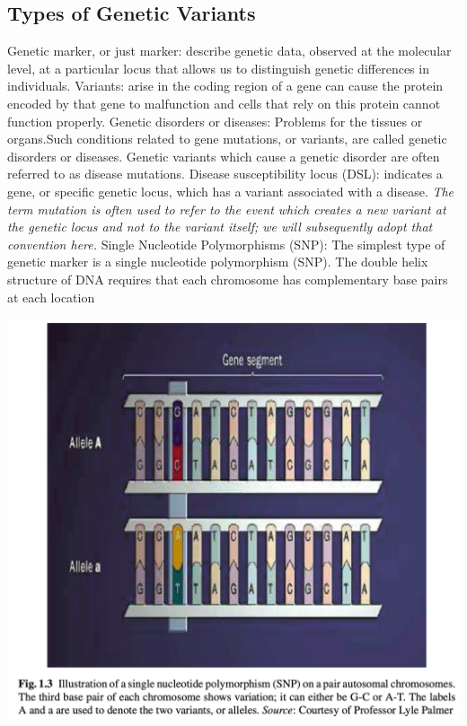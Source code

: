 \documentclass[a4paper,twoside,11pt]{article}
\begin{document}
\subsection{Types of Genetic Variants}
\textcolor{NavyBlue}{Genetic marker, or just marker: }describe genetic data, observed at the molecular level, at a particular locus that allows us to distinguish genetic differences in individuals.
\newline
\newline
\textcolor{NavyBlue}{Variants: }arise in the coding region of a gene can cause the protein encoded by that gene to malfunction and cells that rely on this protein cannot function properly.
\newline
\newline
\textcolor{NavyBlue}{Genetic disorders or diseases: }Problems for the tissues or organs.Such conditions related to gene mutations, or variants, are called genetic disorders or diseases. Genetic variants which cause a genetic disorder are often referred to as disease mutations.
\newline
\newline
\textcolor{NavyBlue}{Disease susceptibility locus (DSL): }indicates a gene, or specific genetic locus, which has a variant associated with a disease.
\newline
\newline
\textcolor{NavyBlue}{\textit{The term mutation is often used to refer to the event which creates a new variant at the genetic locus and not to the variant itself; we will subsequently adopt that convention here.}}
\newline
\newline
\textcolor{NavyBlue}{Single Nucleotide Polymorphisms (SNP): }The simplest type of genetic marker is a single nucleotide polymorphism (SNP). The double helix structure of DNA requires that each chromosome has complementary base pairs at each location
\begin{center}
\includegraphics[scale=0.5]{figure2.png}
\end{center}
\end{document}
